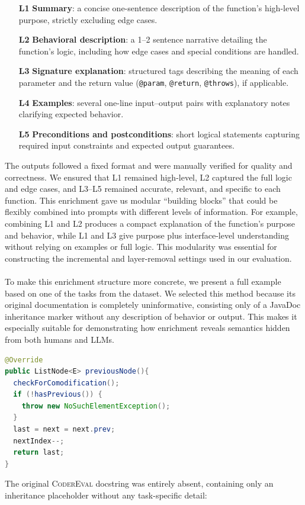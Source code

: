 \documentclass[a4paper]{usiinfbachelorproject}
\begin{document}
\begin{enumerate}[leftmargin=15pt]
  \item[\textbf{L1}] \textbf{Summary}: a concise one-sentence description of the function's high-level purpose, strictly excluding edge cases.
  \item[\textbf{L2}] \textbf{Behavioral description}: a 1--2 sentence narrative detailing the function’s logic, including how edge cases and special conditions are handled.
  \item[\textbf{L3}] \textbf{Signature explanation}: structured tags describing the meaning of each parameter and the return value (\texttt{@param}, \texttt{@return}, \texttt{@throws}), if applicable.
  \item[\textbf{L4}] \textbf{Examples}: several one-line input–output pairs with explanatory notes clarifying expected behavior.
  \item[\textbf{L5}] \textbf{Preconditions and postconditions}: short logical statements capturing required input constraints and expected output guarantees.
\end{enumerate}
The outputs followed a fixed format and were manually verified for quality and correctness. We ensured that L1 remained high-level, L2 captured the full logic and edge cases, and L3–L5 remained accurate, relevant, and specific to each function. This enrichment gave us modular “building blocks” that could be flexibly combined into prompts with different levels of information. For example, combining L1 and L2 produces a compact explanation of the function’s purpose and behavior, while L1 and L3 give purpose plus interface-level understanding without relying on examples or full logic. This modularity was essential for constructing the incremental and layer-removal settings used in our evaluation.\\
\\[2pt]
To make this enrichment structure more concrete, we present a full example based on one of the tasks from the dataset. We selected this method because its original documentation is completely uninformative, consisting only of a JavaDoc inheritance marker without any description of behavior or output. This makes it especially suitable for demonstrating how enrichment reveals semantics hidden from both humans and LLMs.

\clearpage
\begin{lstlisting}[language=Java, caption={Reference implementation of \texttt{previousNode}}, label={lst:previous}]
@Override 
public ListNode<E> previousNode(){
  checkForComodification();
  if (!hasPrevious()) {
    throw new NoSuchElementException();
  }
  last = next = next.prev;
  nextIndex--;
  return last;
}
\end{lstlisting}
The original \textsc{CoderEval} docstring was entirely absent, containing only an inheritance placeholder without any task-specific detail:
\end{document}
